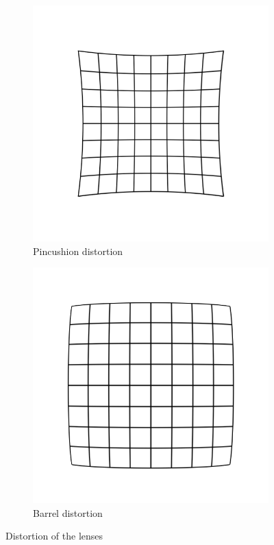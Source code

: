 \documentclass[12pt, twoside]{article}
\begin{document}
\begin{figure}[h]
        \centering
        \begin{subfigure}[b]{0.3\textwidth}
                \includegraphics[scale=1]{PinDist.png}
                \caption{Pincushion distortion}
                \label{fig:pindist}
        \end{subfigure}
        \begin{subfigure}[b]{0.3\textwidth}
                \includegraphics[scale=1]{BarDist.png}
                \caption{Barrel distortion}
                \label{fig:bardist}
        \end{subfigure}
        \caption{Distortion of the lenses}
\end{figure}
\end{document}
